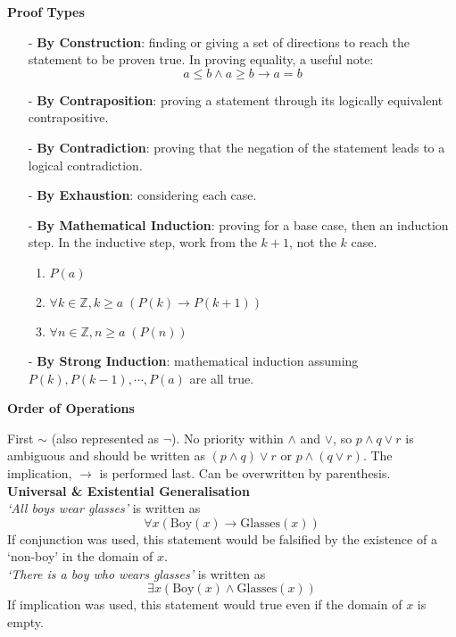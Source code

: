 \documentclass[a4paper]{article}
\newcommand{\subheading}[1]{{\scriptsize\textbf{#1}}}
\begin{document}
\begin{multicols*}{4}
\subheading{Proof Types}
\begin{itemize}[leftmargin=*] \itemsep -0.4em
  \item[-] \textbf{By Construction}: finding or giving a set of directions to
    reach the statement to be proven true. In proving equality, a useful note:
    $$a \leq b \land a \geq b \rightarrow a = b$$
  \item[-] \textbf{By Contraposition}: proving a statement through its logically
    equivalent contrapositive.
  \item[-] \textbf{By Contradiction}: proving that the negation of the statement
    leads to a logical contradiction.
  \item[-] \textbf{By Exhaustion}: considering each case.
  \item[-] \textbf{By Mathematical Induction}: proving for a base case, then an
    induction step. In the inductive step, work from the $k+1$, not the $k$
    case.
    \vspace{-0.5em} %
    \begin{enumerate}[leftmargin=*] \itemsep -0.2em
      \item $P(a)$
      \item $\forall k \in \mathbb{Z}, k \geq a\;(P(k) \rightarrow P(k+1))$
      \item $\forall n \in \mathbb{Z}, n \geq a\;(P(n))$
    \end{enumerate}
  \item[-] \textbf{By Strong Induction}: mathematical induction assuming $P(k),
    P(k-1), \cdots, P(a)$ are all true.
\end{itemize}

\subheading{Order of Operations}

First $\sim$ (also represented as $\neg$). No priority within $\land$ and
$\lor$, so $p \land q \lor r$ is ambiguous and should be written as
$(p \land q) \lor r$ or $p \land (q \lor r)$. The implication, $\rightarrow$ is
performed last. Can be overwritten by parenthesis.\\

\subheading{Universal \& Existential Generalisation}\\
\textit{`All boys wear glasses'} is written as
  $$\forall x (\text{Boy}(x) \rightarrow \text{Glasses}(x)) $$
If conjunction was used, this statement would be falsified by the existence of a
`non-boy' in the domain of $x$.\\

\textit{`There is a boy who wears glasses'} is written as
  $$\exists x (\text{Boy}(x) \land \text{Glasses}(x)) $$
If implication was used, this statement would true even if the domain of $x$ is
empty.\\


\end{multicols*}
\end{document}
